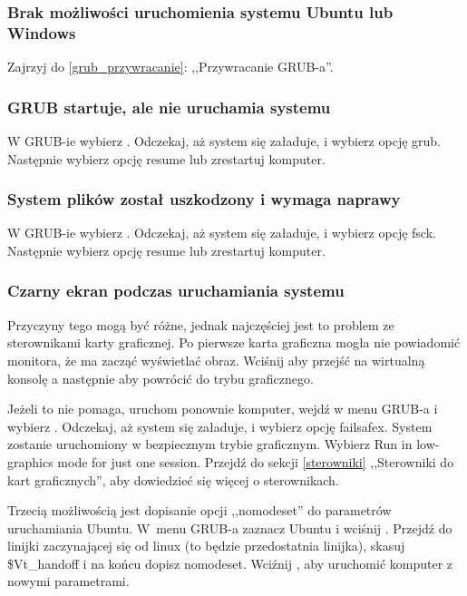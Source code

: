 \label{rozwiązywanie problemów}
\subsubsection{Brak możliwości uruchomienia systemu Ubuntu lub Windows}
Zajrzyj do \ref{grub_przywracanie}: ,,Przywracanie GRUB-a''.

\subsubsection{GRUB startuje, ale nie uruchamia systemu}
W GRUB-ie wybierz . Odczekaj, aż system się załaduje, i wybierz opcję \textcolor{ubuntu_orange}{grub}. Następnie wybierz opcję \textcolor{ubuntu_orange}{resume} lub zrestartuj komputer.

\subsubsection{System plików został uszkodzony i wymaga naprawy}
W GRUB-ie wybierz . Odczekaj, aż system się załaduje, i wybierz opcję \textcolor{ubuntu_orange}{fsck}. Następnie wybierz opcję \textcolor{ubuntu_orange}{resume} lub zrestartuj komputer.

\subsubsection{Czarny ekran podczas uruchamiania systemu}
Przyczyny tego mogą być różne, jednak najczęściej jest to problem ze sterownikami karty graficznej. Po pierwsze karta graficzna mogła nie powiadomić monitora, że ma zacząć wyświetlać obraz. Wciśnij  aby przejść na wirtualną konsolę a następnie  aby powrócić do trybu graficznego.

Jeżeli to nie pomaga, uruchom ponownie komputer, wejdź w menu GRUB-a i wybierz . Odczekaj, aż system się załaduje, i wybierz opcję \textcolor{ubuntu_orange}{failsafex}. System zostanie uruchomiony w bezpiecznym trybie graficznym. Wybierz \textcolor{ubuntu_orange}{Run in low-graphics mode for just one session}. Przejdź do sekcji \ref{sterowniki} ,,Sterowniki do kart graficznych'', aby dowiedzieć się więcej o sterownikach.

Trzecią możliwością jest dopisanie opcji ,,nomodeset'' do parametrów uruchamiania Ubuntu. W~menu GRUB-a zaznacz Ubuntu i wciśnij . Przejdź do linijki zaczynającej się od \textcolor{ubuntu_orange}{linux}	(to będzie przedostatnia linijka), skasuj \$Vt\_handoff i na końcu dopisz \textcolor{ubuntu_orange}{nomodeset}. Wciźnij , aby uruchomić komputer z nowymi parametrami.

